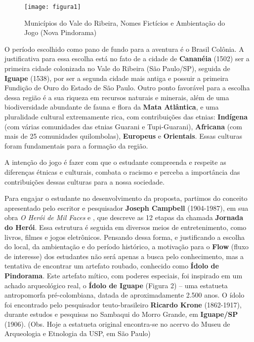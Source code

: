 \begin{figure}[!h]
    \centering
    \caption{ Municípios do Vale do Ribeira, Nomes Fictícios e Ambientação do Jogo (Nova Pindorama) }%
    \label{fig:figura1}
    \texttt{[image: figura1]}
    \end{figure}

    O período escolhido como pano de fundo para a aventura é o Brasil Colônia. A justificativa para essa escolha está no fato de a cidade de \textbf{Cananéia} (1502) ser a primeira cidade colonizada no Vale do Ribeira (São Paulo/SP), seguida de \textbf{Iguape} (1538), por ser a segunda cidade mais antiga e possuir a primeira Fundição de Ouro do Estado de São Paulo. Outro ponto favorável para a escolha dessa região é a sua riqueza em recursos naturais e minerais, além de uma biodiversidade abundante de fauna e flora da \textbf{Mata Atlântica}, e uma pluralidade cultural extremamente rica, com contribuições das etnias: \textbf{Indígena} (com várias comunidades das etnias Guarani e Tupi-Guarani), \textbf{Africana} (com mais de 25 comunidades quilombolas), \textbf{Europeus} e \textbf{Orientais}. Essas culturas foram fundamentais para a formação da região.

    A intenção do jogo é fazer com que o estudante compreenda e respeite as diferenças étnicas e culturais, combata o racismo e perceba a importância das contribuições dessas culturas para a nossa sociedade.
    
    Para engajar o estudante no desenvolvimento da proposta, partimos do conceito apresentado pelo escritor e pesquisador \textbf{Joseph Campbell} (1904-1987), em sua obra \textit{O Herói de Mil Faces} \textcite{campbell1989heroi} e , que descreve as 12 etapas da chamada \textbf{Jornada do Herói}. Essa estrutura é seguida em diversos meios de entretenimento, como livros, filmes e jogos eletrônicos. Pensando dessa forma, e justificando a escolha do local, da ambientação e do período histórico, a motivação para o \textbf{Flow} (fluxo de interesse) dos estudantes não será apenas a busca pelo conhecimento, mas a tentativa de encontrar um artefato roubado, conhecido como \textbf{Ídolo de Pindorama}. Este artefato mítico, com poderes especiais, foi inspirado em um achado arqueológico real, o \textbf{Ídolo de Iguape} \textcite{kroneidolo} (Figura 2) – uma estatueta antropomorfa pré-colombiana, datada de aproximadamente 2.500 anos. O ídolo foi encontrado pelo pesquisador teuto-brasileiro \textbf{Ricardo Krone} (1862-1917), durante estudos e pesquisas no Sambaqui do Morro Grande, em \textbf{Iguape/SP} (1906). (Obs. Hoje a estatueta original encontra-se no acervo do Museu de Arqueologia e Etnologia da USP, em São Paulo)
    
